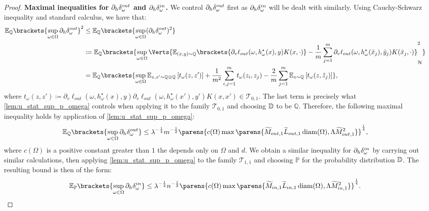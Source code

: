 \begin{proof}
{\bf Maximal inequalities for $\partial_{h}\delta_\omega^{out}$ and $\partial_{h}\delta_\omega^{in}$.}
We control $\partial_{h}\delta_\omega^{out}$ first as $\partial_{h}\delta_\omega^{in}$ will be dealt with similarly. Using Cauchy-Schwarz inequality and standard calculus, we have that:
\begin{align*}
	\mathbb{E}_{\mathbb{Q}}\brackets{\sup_{\omega\in \Omega} \Douth }^2
	&\leq \mathbb{E}_{\mathbb{Q}}\brackets{\sup_{\omega\in \Omega} (\Douth)^2 }\\
	&\coloneqq \mathbb{E}_{\mathbb{Q}}\brackets{ \sup_{\omega\in \Omega} \Verts{ \mathbb{E}_{(x,y)\sim \mathbb{Q}}\brackets{\partial_v\ell_{out}(\omega,h_{\omega}^{\star}(x),y)K(x,\cdot)} - \frac{1}{m}\sum_{j=1}^m \partial_v\ell_{out}(\omega,h_{\omega}^{\star}(\tilde{x}_j),\tilde{y}_j)K(\tilde{x}_j,\cdot) }_{\mathcal{H}}^2 }\\
	&= \mathbb{E}_{\mathbb{Q}}\brackets{ \sup_{\omega\in \Omega} \mathbb{E}_{z,z'\sim\mathbb{Q}\otimes\mathbb{Q}}\left[t_\omega(z,z')\right]+\frac{1}{m^2}\sum_{i,j=1}^m t_\omega(z_i,z_j)-\frac{2}{m}\sum_{j=1}^m\mathbb{E}_{z\sim\mathbb{Q}}\left[t_\omega(z,\tilde{z}_j)\right]},
\end{align*}
 where $t_\omega(z,z') \coloneqq \partial_v\ell_{out}(\omega,h_{\omega}^{\star}(x),y)\partial_v\ell_{out}(\omega,h_{\omega}^{\star}(x'),y')K(x,x')\in \mathcal{T}_{0,1}$. The last term is precisely what \cref{lem:u_stat_sup_p_omega} controls when applying it to the family $\mathcal{T}_{0,1}$ and choosing $\mathbb{D}$ to be $\mathbb{Q}$. Therefore, the following maximal inequality holds by application of \cref{lem:u_stat_sup_p_omega}:
 \begin{align*}
 	\mathbb{E}_{\mathbb{Q}}\brackets{\sup_{\omega\in \Omega} \Douth }\leq 
 	\lambda^{-\frac{1}{4}}m^{-\frac{1}{2}}  \parens{c(\Omega)\max\parens{\widetilde{M}_{out,1}\widetilde{L}_{out,1}\diam(\Omega),\Lambda\widetilde{M}_{out,1}^2}}^{\frac{1}{4}},
 \end{align*}
 where $c(\Omega)$ is a positive constant {greater than $1$} the depends only on $\Omega$ and $d$. We obtain a similar inequality for $\partial_{h}\delta_\omega^{in}$ by carrying out similar calculations, then applying \cref{lem:u_stat_sup_p_omega} to the family $\mathcal{T}_{1,1}$ and choosing $\mathbb{P}$ for the probability distribution $\mathbb{D}$. The resulting bound is then of the form:
\begin{align*}
 	\mathbb{E}_{\mathbb{P}}\brackets{\sup_{\omega\in \Omega} \Dinh }\leq 
 	\lambda^{-\frac{1}{4}}n^{-\frac{1}{2}} \parens{c(\Omega)\max\parens{\widetilde{M}_{in,1}\widetilde{L}_{in,1}\diam(\Omega),\Lambda\widetilde{M}_{in,1}^2}}^{\frac{1}{4}}.
 \end{align*}


\end{proof}
